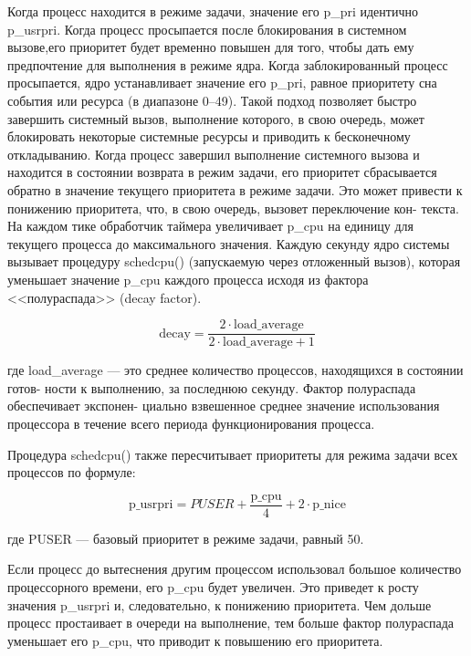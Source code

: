 Когда процесс находится в режиме задачи, значение его
{\ttfamily p\_pri} идентично {\ttfamily p\_usrpri}. Когда процесс
просыпается после блокирования в системном вызове,его приоритет будет
временно повышен для того, чтобы дать ему предпочтение для выполнения
в режиме ядра. Когда заблокированный процесс просыпается, ядро
устанавливает значение его {\ttfamily p\_pri}, равное приоритету сна
события или ресурса (в диапазоне 0–49). Такой подход позволяет быстро
завершить системный вызов, выполнение которого, в свою очередь,
может блокировать некоторые системные ресурсы и приводить к
бесконечному откладыванию. Когда процесс завершил выполнение
системного вызова и находится в состоянии возврата в режим задачи,
его приоритет сбрасывается обратно в значение текущего приоритета в
режиме задачи. Это может привести к понижению приоритета, что, в
свою очередь, вызовет переключение кон- текста. На каждом тике
обработчик таймера увеличивает {\ttfamily p\_cpu} на единицу для
текущего процесса до максимального значения. Каждую секунду ядро
системы вызывает процедуру {\ttfamily schedcpu()} (запускаемую через
отложенный вызов), которая уменьшает значение {\ttfamily p\_cpu}
каждого процесса исходя из фактора <<полураспада>> (decay factor).

\begin{equation}
    \text{decay} =
    \frac
        {2 \cdot \text{load\_average}}
        {2 \cdot \text{load\_average} + 1}
\end{equation}

где load\_average — это среднее количество процессов, находящихся в состоянии готов- ности к выполнению, за последнюю секунду. Фактор полураспада обеспечивает экспонен- циально взвешенное среднее значение использования процессора в течение всего периода функционирования процесса.

Процедура schedcpu() также пересчитывает приоритеты для режима задачи всех процессов по формуле:

\begin{equation}
    \text{p\_usrpri} =
    PUSER +
    \frac{\text{p\_cpu}}{4} +
    2 \cdot \text{p\_nice}
\end{equation}

где PUSER — базовый приоритет в режиме задачи, равный 50.

Если процесс до вытеснения другим процессом использовал большое
количество процессорного времени, его {\ttfamily p\_cpu}
будет увеличен. Это приведет к росту значения {\ttfamily p\_usrpri}
и, следовательно, к понижению приоритета. Чем дольше процесс
простаивает в очереди на выполнение, тем больше фактор
полураспада уменьшает его {\ttfamily p\_cpu}, что приводит к
повышению его приоритета.

